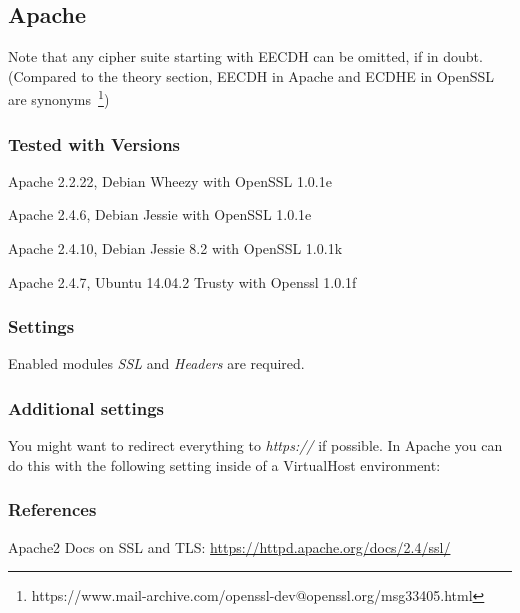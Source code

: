 \subsection{Apache}

Note that any cipher suite starting with EECDH can be omitted, if in doubt.
(Compared to the theory section, EECDH in Apache and ECDHE in OpenSSL are
synonyms~\footnote{https://www.mail-archive.com/openssl-dev@openssl.org/msg33405.html})

\subsubsection{Tested with Versions}
\begin{itemize*}
  \item Apache 2.2.22, Debian Wheezy with OpenSSL 1.0.1e
  \item Apache 2.4.6, Debian Jessie with OpenSSL 1.0.1e
	\item Apache 2.4.10, Debian Jessie 8.2 with OpenSSL 1.0.1k
  \item Apache 2.4.7, Ubuntu 14.04.2 Trusty with Openssl 1.0.1f
\end{itemize*}

\subsubsection{Settings}
Enabled modules \emph{SSL} and \emph{Headers} are required.


\subsubsection{Additional settings}
You might want to redirect everything to \emph{https://} if possible. In Apache
you can do this with the following setting inside of a VirtualHost environment:



\subsubsection{References}
\begin{itemize*}
  \item Apache2 Docs on SSL and TLS: \url{https://httpd.apache.org/docs/2.4/ssl/}
\end{itemize*}


